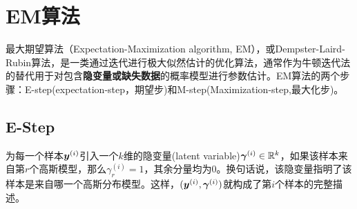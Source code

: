 \documentclass[a4paper,UTF8]{article}
\begin{document}
\section{EM算法}
最大期望算法（Expectation-Maximization algorithm, EM），或Dempster-Laird-Rubin算法，是一类通过迭代进行极大似然估计的优化算法，通常作为牛顿迭代法的替代用于对包含\textbf{隐变量或缺失数据}的概率模型进行参数估计。EM算法的两个步骤：E-step(expectation-step，期望步)和M-step(Maximization-step,最大化步)。

\subsection{E-Step}

为每一个样本\(\boldsymbol{y}^{(i)}\)引入一个\(k\)维的隐变量(latent variable)\(\boldsymbol{\gamma}^{(i)}\in\mathbb{R}^k\)，如果该样本来自第\(r\)个高斯模型，那么\(\gamma^{(i)}_r=1\)，其余分量均为0。换句话说，该隐变量指明了该样本是来自哪一个高斯分布模型。这样，\((\boldsymbol{y}^{(i)},\boldsymbol{\gamma}^{(i)})\)就构成了第\(i\)个样本的完整描述。
\end{document}
